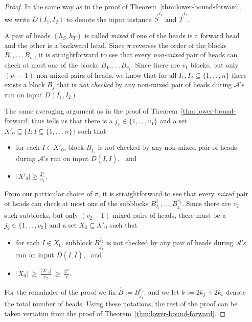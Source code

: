 \documentclass[proceedings]{stacs}
\theoremstyle{plain}\newtheorem{satz}[thm]{Satz}
\theoremstyle{definition}\newtheorem{crucial}[thm]{Crucial Definition}
\newcommand{\ov}[1]{\overline{#1}}
\newcommand{\vek}[1]{\vec{#1}}
\renewcommand*{\geq}{\ensuremath{\geqslant}}
\newcommand{\twodots}{.\,.\,}
\newcommand{\set}[1]{\ensuremath{\{ #1 \}}}
\newcommand{\setc}[2]{\set{ #1 : #2}}
\newcommand*{\A}{\ensuremath{\mathcal{A}}}
\newenvironment{mi}{\begin{itemize}}{\end{itemize}}
\newcommand{\kf}{\ensuremath{k_{\scriptscriptstyle f}}}
\newcommand{\kb}{\ensuremath{k_{\scriptscriptstyle b}}}
\newcommand{\vv}{\ensuremath{v}}
\begin{document}
\begin{proof}
In the same way as in the proof of Theorem~\ref{thm:lower-bound-forward}, we
write $D(I_1,I_2)$ to denote the input instance $\vek{S}^{I_1}$ and $\vek{T}^{I_2}$.

A pair of heads $(h_S,h_T)$ is called \emph{mixed} if one of the heads is a
forward head and the other is a backward head.
Since $\pi$ reverses the order of the blocks $B_1,\twodots,B_{\vv_1}$, 
it is straightforward to see that every \emph{non-mixed} pair of heads can
check at most one of the blocks $B_1,\twodots,B_{\vv_1}$. Since there are
$\vv_1$ blocks, but only $(\vv_1-1)$ non-mixed pairs of heads, we know that for
all $I_1,I_2\subseteq \set{1,\twodots,n}$ there exists a block $B_j$ that is 
\emph{not checked} by any non-mixed pair of heads during $\A$'s run on input
$D(I_1,I_2)$.

The same averaging argument as in the proof of Theorem~\ref{thm:lower-bound-forward}
thus tells us that there is a
$j_1\in\set{1,\twodots,\vv_1}$ and 
a set $X'_{0}\subseteq \setc{I}{I\subseteq\set{1,\twodots,n}}$
such that \vspace{1ex}
\begin{mi}
 \item 
   for each $I\in X'_{0}$, block $B_{j_1}$ is not checked by any non-mixed pair of
   heads during $\A$'s run on input
   $D(I,\ov{I})$, \ and  \vspace{1ex}
 \item 
   $|X'_{0}| \geq \frac{2^n}{\vv_1}$. \vspace{1ex}
\end{mi}
From our particular choice of $\pi$, it is straightforward to see that every
\emph{mixed} pair of heads can check at most one of the subblocks
$B_{j_1}^1,\ldots,B_{j_1}^{\vv_2}$. Since there are $\vv_2$ such subblocks, but
only $(\vv_2 -1)$ mixed pairs of heads, there must be a $j_2\in\set{1,\twodots,\vv_2}$ 
and a set $X_0\subseteq X'_0$ such that \vspace{1ex}
\begin{mi}
 \item 
   for each $I\in X_{0}$, subblock $B_{j_1}^{j_2}$ is not checked by any pair of
   heads during $\A$'s run on input
   $D(I,\ov{I})$, \ and  \vspace{1ex}
 \item 
   $|X_{0}| \ \geq \ \frac{|X'_0|}{\vv_2} \ \geq \ \frac{2^n}{\vv}$. \vspace{1ex}
\end{mi}
For the remainder of the proof we fix $\hat{B}:= B_{j_1}^{j_2}$, and we let
$k:= 2\kf + 2\kb$ denote the total number of heads. Using these notations, 
the rest of the proof can be taken vertatim from the proof of 
Theorem~\ref{thm:lower-bound-forward}.
\end{proof}
\end{document}
